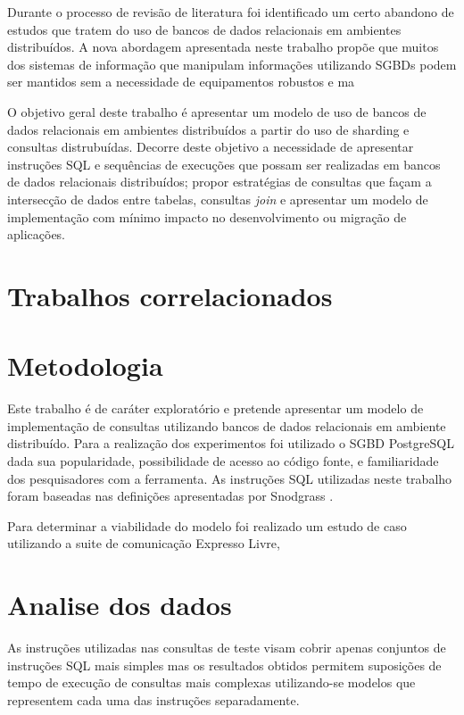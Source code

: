 \documentclass[12pt, a4paper]{article}
\begin{document}
Durante o processo de revisão de literatura foi identificado um certo abandono de estudos que tratem
do uso de bancos de dados relacionais em ambientes distribuídos. A nova abordagem apresentada neste
trabalho propõe que muitos dos sistemas de informação que manipulam informações utilizando SGBDs podem
ser mantidos sem a necessidade de equipamentos robustos e ma

O objetivo geral deste trabalho é apresentar um modelo de uso de bancos de dados relacionais em ambientes distribuídos a 
partir do uso de sharding e consultas distrubuídas. Decorre deste objetivo a necessidade de apresentar instruções SQL e 
sequências de execuções que possam ser realizadas em bancos de dados relacionais distribuídos; propor estratégias 
de consultas que façam a intersecção de dados entre tabelas, consultas \textit{join} e apresentar
um modelo de implementação com mínimo impacto no desenvolvimento ou migração de aplicações.



\section{Trabalhos correlacionados}

\section{Metodologia}

Este trabalho é de caráter exploratório e pretende apresentar um modelo de implementação de consultas
utilizando bancos de dados relacionais em ambiente distribuído. Para a realização dos experimentos
foi utilizado o SGBD PostgreSQL dada sua popularidade, possibilidade de acesso ao código fonte, e 
familiaridade dos pesquisadores com a ferramenta. As instruções SQL utilizadas neste trabalho foram
baseadas nas definições apresentadas por Snodgrass \cite{snodgrass1994tsql2}.


Para determinar a viabilidade do modelo foi realizado um estudo de caso utilizando a suite de comunicação
Expresso Livre, 


\section{Analise dos dados}

As instruções utilizadas nas consultas de teste visam cobrir apenas conjuntos de instruções SQL mais simples
mas os resultados obtidos permitem suposições de tempo de execução de consultas mais complexas utilizando-se
modelos que representem cada uma das instruções separadamente.
\end{document}
